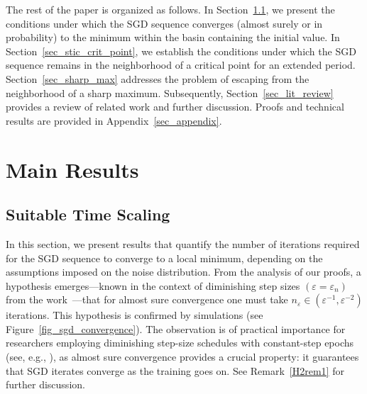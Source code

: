 \documentclass{article}
\theoremstyle{plain}
\theoremstyle{definition}
\theoremstyle{remark}
\begin{document}

The rest of the paper is organized as follows. In Section~\ref{sec_suit_time_scal}, we present the conditions under which the SGD sequence converges (almost surely or in probability) to the minimum within the basin containing the initial value. 
In Section~\ref{sec_stic_crit_point}, we establish the conditions under which the SGD sequence remains in the neighborhood of a critical point for an extended period. 
Section~\ref{sec_sharp_max} addresses the problem of escaping from the neighborhood of a sharp maximum. 
Subsequently, Section~\ref{sec_lit_review} provides a review of related work and further discussion. 
Proofs and technical results are provided in Appendix~\ref{sec_appendix}.

\section{Main Results}
\subsection{Suitable Time Scaling}\label{sec_suit_time_scal}


In this section, we present results that quantify the number of iterations required for the SGD sequence to converge to a local minimum, depending on the assumptions imposed on the noise distribution. From the analysis of our proofs, a hypothesis emerges---known in the context of diminishing step sizes $(\varepsilon = \varepsilon_n)$ from the work~\citep{RobbinsMonro1951}---that for almost sure convergence one must take $n_{\varepsilon} \in \left( \varepsilon^{-1}, \varepsilon^{-2}\right)$ iterations. This hypothesis is confirmed by  simulations (see Figure~\ref{fig_sgd_convergence}). The observation is of practical importance for researchers employing diminishing step-size schedules with constant-step epochs (see, e.g., \cite{you2019does}), as almost sure convergence provides a crucial property:  it guarantees that SGD iterates converge as the training goes on. See Remark~\ref{H2rem1} for further discussion. 
\end{document}
